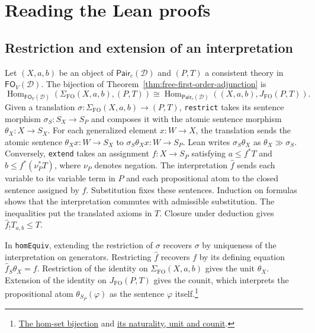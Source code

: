 \section{Reading the Lean proofs}\label{app:reading-lean-proofs}

\newcommand{\CEIproof}[3]{\href{https://github.com/flengyel/CategoricalEssentialIncompleteness/blob/cei-v94-palomar-v4/Lean/#1.lean\##2}{#3}}
\newcommand{\CEIregisteredproof}[2]{\href{https://github.com/flengyel/CategoricalEssentialIncompleteness/blob/cei-v72-palomar-v3/Lean/CEIPalomar/Solution.lean\##1}{#2}}
\newcommand{\CEIregistration}{\href{https://palomar-registry.org/entry?id=PALOMAR-2026-11-22-000009&version=3}{PALOMAR-2026-11-22-000009, version~3}}

\subsection{Restriction and extension of an interpretation}

Let $(X,a,b)$ be an object of $\mathsf{Pair}_c(\mathcal D)$ and
$(P,T)$ a consistent theory in $\mathsf{FO}_V(\mathcal D)$.
The bijection of Theorem~\ref{thm:free-first-order-adjunction} is
\[
 \operatorname{Hom}_{\mathsf{FO}_V(\mathcal D)}(\Sigma_{\mathrm{FO}}(X,a,b),(P,T))
 \cong
 \operatorname{Hom}_{\mathsf{Pair}_c(\mathcal D)}((X,a,b),J_{\mathrm{FO}}(P,T)).
\]
Given a translation $\sigma:\Sigma_{\mathrm{FO}}(X,a,b)\to(P,T)$, \texttt{restrict}
takes its sentence morphism $\sigma_S:S_X\to S_P$ and composes it with
the atomic sentence morphism $\theta_X:X\to S_X$. For each generalized
element $x:W\to X$, the translation sends the atomic sentence
$\theta_Xx:W\to S_X$ to $\sigma_S\theta_Xx:W\to S_P$. Lean writes
$\sigma_S\theta_X$ as $\theta_X\mathbin{\gg}\sigma_S$.
Conversely, \texttt{extend} takes an assignment $f:X\to S_P$ satisfying
$a\leq f^*T$ and $b\leq f^*(\nu_P^*T)$, where $\nu_P$ denotes negation.
The interpretation $\widehat f$ sends each variable to its variable term
in $P$ and each propositional atom to the closed sentence assigned by $f$.
Substitution fixes these sentences.
Induction on formulas shows that the interpretation commutes with
admissible substitution. The inequalities
put the translated axioms in $T$. Closure under deduction gives
$\widehat f_!T_{a,b}\leq T$.

In \texttt{homEquiv}, extending the restriction of $\sigma$ recovers
$\sigma$ by uniqueness of the interpretation on generators. Restricting
$\widehat f$ recovers $f$ by its defining equation
$\widehat f_S\theta_X=f$. Restriction of the identity on
$\Sigma_{\mathrm{FO}}(X,a,b)$ gives the unit $\theta_X$. Extension of the
identity on $J_{\mathrm{FO}}(P,T)$ gives the counit, which interprets the
propositional atom $\theta_{S_P}(\varphi)$ as the sentence $\varphi$
itself.\footnote{\CEIproof{CategoricalEssentialIncompleteness/V46SignedFirstOrderAdjunction}{L27-L56}{The hom-set bijection}
and \CEIproof{CategoricalEssentialIncompleteness/V46SignedFirstOrderAdjunction}{L58-L91}{its naturality, unit and counit}.}

